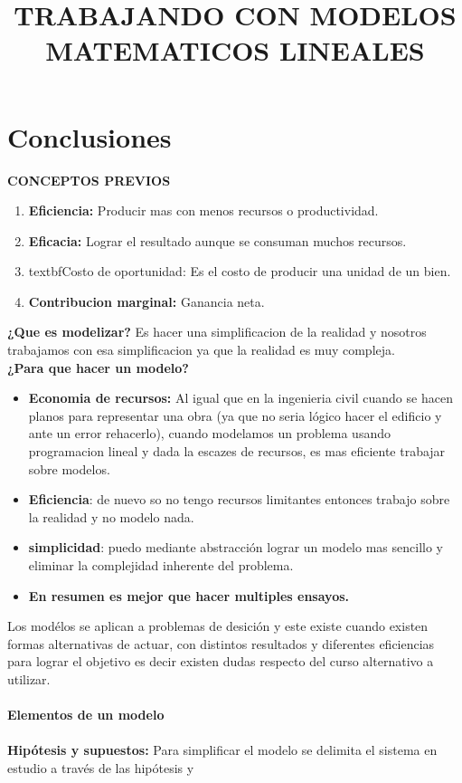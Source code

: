 \documentclass[12pt]{book}
\begin{document}
\chapter{Conclusiones}

\textbf{CONCEPTOS PREVIOS}
\begin{enumerate}
	\item \textbf{Eficiencia:} Producir mas con menos recursos o productividad.
	\item \textbf{Eficacia:} Lograr el resultado aunque se consuman muchos recursos.
	\item textbf{Costo de oportunidad:} Es el costo de producir una unidad de un bien.
	\item \textbf{Contribucion marginal:} Ganancia neta.
\end{enumerate}
\title{\textbf{TRABAJANDO CON MODELOS MATEMATICOS LINEALES}}
\textbf{¿Que es modelizar?} Es hacer una simplificacion de la realidad y nosotros trabajamos con esa simplificacion ya que la realidad es muy compleja.
\\
\textbf{¿Para que hacer un modelo?}
\begin{itemize}
\item \textbf{Economia de recursos:} Al igual que en la ingenieria civil cuando se hacen planos para representar una obra (ya que no seria l\'ogico hacer el edificio y ante un error rehacerlo), cuando modelamos un problema usando programacion lineal y dada la escazes de recursos, es mas eficiente trabajar sobre modelos.
\item \textbf{Eficiencia}: de nuevo so no tengo recursos limitantes entonces trabajo sobre la realidad y no modelo nada.
\item \textbf{simplicidad}: puedo mediante abstracci\'on lograr un modelo mas sencillo y eliminar la complejidad inherente del problema.
\item \textbf{En resumen es mejor que hacer multiples ensayos.}
\end{itemize}
Los mod\'elos se aplican a problemas de desici\'on y este existe cuando existen formas alternativas de actuar, con distintos resultados y diferentes eficiencias para lograr el objetivo es decir existen dudas respecto del curso alternativo a utilizar.
\\
\\
\textbf{Elementos de un modelo}
\\
\\
\textbf{Hipótesis y supuestos:} Para simplificar el modelo se delimita el sistema en estudio a través de las hipótesis y
\end{document}
